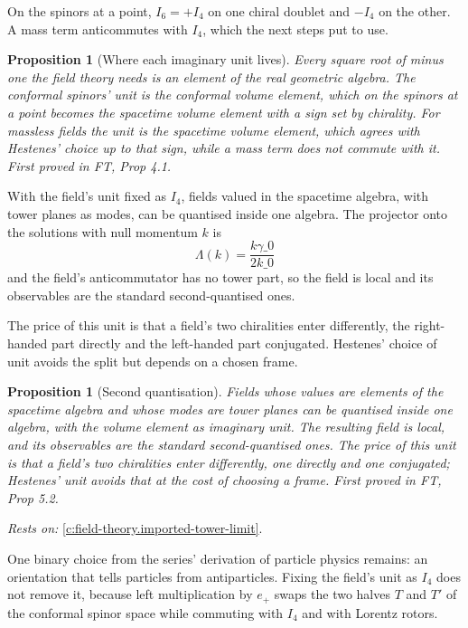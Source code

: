 \documentclass[11pt]{article}
\newtheorem{proposition}[theorem]{Proposition}
\theoremstyle{definition}
\theoremstyle{plain}
\begin{document}
On the spinors at a point, $I_6 = +I_4$ on one chiral doublet and $-I_4$ on the other. A mass term anticommutes with $I_4$, which the next steps put to use.

\begin{proposition}[Where each imaginary unit lives]\label{c:field-theory.where-each-lives}
Every square root of minus one the field theory needs is an element of the real geometric algebra. The conformal spinors' unit is the conformal volume element, which on the spinors at a point becomes the spacetime volume element with a sign set by chirality. For massless fields the unit is the spacetime volume element, which agrees with Hestenes' choice up to that sign, while a mass term does not commute with it.
\emph{First proved in} FT, Prop 4.1.
\end{proposition}

With the field's unit fixed as $I_4$, fields valued in the spacetime algebra, with tower planes as modes, can be quantised inside one algebra. The projector onto the solutions with null momentum $k$ is \[ \Lambda(k) = \frac{k\gamma\_0}{2k\_0} \] and the field's anticommutator has no tower part, so the field is local and its observables are the standard second-quantised ones.

The price of this unit is that a field's two chiralities enter differently, the right-handed part directly and the left-handed part conjugated. Hestenes' choice of unit avoids the split but depends on a chosen frame.

\begin{proposition}[Second quantisation]\label{c:field-theory.second-quantisation}
Fields whose values are elements of the spacetime algebra and whose modes are tower planes can be quantised inside one algebra, with the volume element as imaginary unit. The resulting field is local, and its observables are the standard second-quantised ones. The price of this unit is that a field's two chiralities enter differently, one directly and one conjugated; Hestenes' unit avoids that at the cost of choosing a frame.
\emph{First proved in} FT, Prop 5.2.
\end{proposition}
\noindent\emph{Rests on:} \ref{c:field-theory.imported-tower-limit}.

One binary choice from the series' derivation of particle physics remains: an orientation that tells particles from antiparticles. Fixing the field's unit as $I_4$ does not remove it, because left multiplication by $e_+$ swaps the two halves $T$ and $T'$ of the conformal spinor space while commuting with $I_4$ and with Lorentz rotors.
\end{document}
